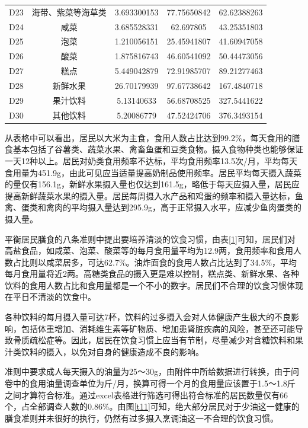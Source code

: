 \documentclass[withoutpreface,bwprint]{cumcmthesis} %
\begin{document}
\begin{table}[!ht]
{\begin{tabular}{ccccc}
D23  & 海带、紫菜等海草类        & 3.693300153 & 77.75650842 & 62.62388263 \\
D24  & 咸菜               & 3.685528331 & 62.697805   & 43.25351803 \\
D25  & 泡菜               & 1.210056151 & 25.45941807 & 41.60947058 \\
D26  & 酸菜               & 1.875816743 & 46.60541092 & 50.44473056 \\
D27  & 糕点               & 5.449042879 & 72.91985707 & 89.21277463 \\
D28  & 新鲜水果             & 26.70179939 & 97.67738642 & 167.4840718 \\
D29  & 果汁饮料             & 5.13140633  & 56.68708525 & 327.5441622 \\
D30  & 其他饮料             & 5.20086779  & 47.52424706 & 376.3493154 \\ \hline
\end{tabular}}
\end{table}

从表格中可以看出，居民以大米为主食，食用人数占比达到99.2\%，每天食用的膳食基本包括了谷薯类、蔬菜水果、禽畜鱼蛋和豆类食物。摄入食物种类也能够保证一天12种以上。居民对奶类食用频率不达标，平均食用频率13.5次/月，平均每天食用量为451.9g，由此可见应当适量提高奶制品使用频率。居民平均每天摄入蔬菜的量仅有156.1g，新鲜水果摄入量也仅达到161.5g，略低于每天应摄入量，居民应提高新鲜蔬菜水果的摄入量。居民每周摄入水产品和鸡蛋的频率和摄入量达标，鱼禽、蛋类和禽肉的平均摄入量达到295.9g，高于正常摄入水平，应减少鱼肉蛋类的摄入量。

平衡居民膳食的八条准则中提出要培养清淡的饮食习惯，由表\ref{1}可知，居民们对高盐食品，如咸菜、泡菜、酸菜等的每月食用量平均为12.9两，食用频率和食用人数占比则以咸菜居多，可达62.7\%。油炸面食的食用人数占比达到了34.5\%，平均每月食用量将近2两。高糖类食品的摄入更是难以控制，糕点类、新鲜水果、各种饮料的食用人数占比和食用量都是一个不小的数字。居民们不合理的饮食习惯体现在平日不清淡的饮食中。

各种饮料的每月摄入量可达7杯，饮料的过多摄入会对人体健康产生极大的不良影响，包括体重增加、消耗维生素等矿物质、增加患肾脏疾病的风险，甚至还可能导致骨质疏松症等。因此，居民在饮食习惯上应当有节制，尽量减少对含糖饮料和果汁类饮料的摄入，以免对自身的健康造成不良的影响。

 准则中要求成人每天摄入的油量为25～30g，由附件中所给数据进行转换，由于问卷中的食用油量调查单位为斤/月，换算可得一个月的食用量应该置于1.5～1.8斤之间才算符合标准。通过excel表格进行筛选可得出符合标准的居民数量仅有66个，占全部调查人数的0.86\%。由图\ref{t11}可知，绝大部分居民对于少油这一健康的膳食准则并未很好的执行，仍然有过多摄入烹调油这一不合理的饮食习惯。
\end{document}

